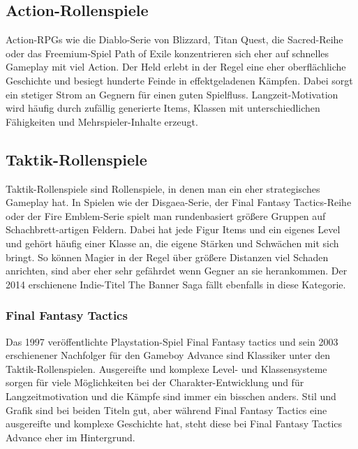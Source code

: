 \documentclass[extern,palatino]{cgBA}
\begin{document}
	\subsection{Action-Rollenspiele}
	Action-RPGs wie die Diablo-Serie von Blizzard, Titan Quest, die Sacred-Reihe oder das Freemium-Spiel Path of Exile konzentrieren sich eher auf schnelles Gameplay mit viel Action. Der Held erlebt in der Regel eine eher oberflächliche Geschichte und besiegt hunderte Feinde in effektgeladenen Kämpfen. Dabei sorgt ein stetiger Strom an Gegnern für einen guten Spielfluss. Langzeit-Motivation wird häufig durch zufällig generierte Items, Klassen mit unterschiedlichen Fähigkeiten und Mehrspieler-Inhalte erzeugt.
	\subsection{Taktik-Rollenspiele}
	Taktik-Rollenspiele sind Rollenspiele, in denen man ein eher strategisches Gameplay hat. In Spielen wie der Disgaea-Serie, der Final Fantasy Tactics-Reihe oder der Fire Emblem-Serie spielt man rundenbasiert größere Gruppen auf Schachbrett-artigen Feldern. Dabei hat jede Figur Items und ein eigenes Level und gehört häufig einer Klasse an, die eigene Stärken und Schwächen mit sich bringt. So können Magier in der Regel über größere Distanzen viel Schaden anrichten, sind aber eher sehr gefährdet wenn Gegner an sie herankommen. Der 2014 erschienene Indie-Titel The Banner Saga fällt ebenfalls in diese Kategorie.
	\subsubsection{Final Fantasy Tactics}
	Das 1997 veröffentlichte Playstation-Spiel Final Fantasy tactics und sein 2003 erschienener Nachfolger für den Gameboy Advance sind Klassiker unter den Taktik-Rollenspielen. Ausgereifte und komplexe Level- und Klassensysteme sorgen für viele Möglichkeiten bei der Charakter-Entwicklung und für Langzeitmotivation und die Kämpfe sind immer ein bisschen anders. Stil und Grafik sind bei beiden Titeln gut, aber während Final Fantasy Tactics eine ausgereifte und komplexe Geschichte hat, steht diese bei Final Fantasy Tactics Advance eher im Hintergrund.
\end{document}
